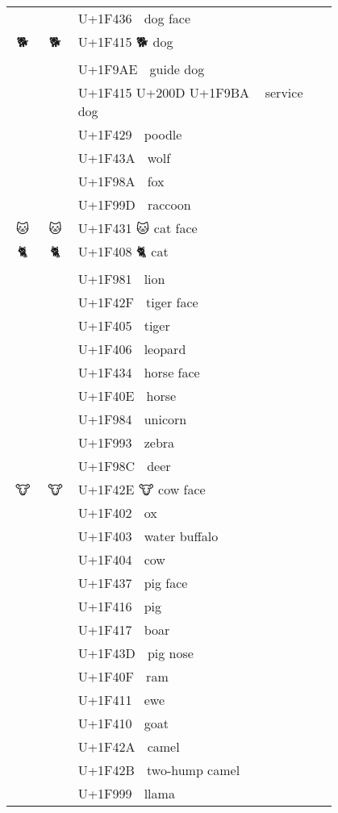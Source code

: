 \documentclass[a4paper,12pt]{article}
\newcommand{\fontA}[1]{{\fontspec[RawFeature={mode=harf,+dist,+ccmp}]{Segoe UI Emoji} #1}}
\newcommand{\fontB}[1]{{\fontspec[RawFeature={mode=harf,+dist,+ccmp}]{Noto Color Emoji} #1}}
\begin{document}
\begin{longtable}[c]{ccp{0.8\linewidth}}
\fontA{🐶}&\fontB{🐶}&U+1F436 🐶 dog face\\
\fontA{🐕}&\fontB{🐕}&U+1F415 🐕 dog\\
\fontA{🦮}&\fontB{🦮}&U+1F9AE 🦮 guide dog\\
\fontA{🐕‍🦺}&\fontB{🐕‍🦺}&U+1F415 U+200D U+1F9BA 🐕‍🦺 service dog\\
\fontA{🐩}&\fontB{🐩}&U+1F429 🐩 poodle\\
\fontA{🐺}&\fontB{🐺}&U+1F43A 🐺 wolf\\
\fontA{🦊}&\fontB{🦊}&U+1F98A 🦊 fox\\
\fontA{🦝}&\fontB{🦝}&U+1F99D 🦝 raccoon\\
\fontA{🐱}&\fontB{🐱}&U+1F431 🐱 cat face\\
\fontA{🐈}&\fontB{🐈}&U+1F408 🐈 cat\\
\fontA{🦁}&\fontB{🦁}&U+1F981 🦁 lion\\
\fontA{🐯}&\fontB{🐯}&U+1F42F 🐯 tiger face\\
\fontA{🐅}&\fontB{🐅}&U+1F405 🐅 tiger\\
\fontA{🐆}&\fontB{🐆}&U+1F406 🐆 leopard\\
\fontA{🐴}&\fontB{🐴}&U+1F434 🐴 horse face\\
\fontA{🐎}&\fontB{🐎}&U+1F40E 🐎 horse\\
\fontA{🦄}&\fontB{🦄}&U+1F984 🦄 unicorn\\
\fontA{🦓}&\fontB{🦓}&U+1F993 🦓 zebra\\
\fontA{🦌}&\fontB{🦌}&U+1F98C 🦌 deer\\
\fontA{🐮}&\fontB{🐮}&U+1F42E 🐮 cow face\\
\fontA{🐂}&\fontB{🐂}&U+1F402 🐂 ox\\
\fontA{🐃}&\fontB{🐃}&U+1F403 🐃 water buffalo\\
\fontA{🐄}&\fontB{🐄}&U+1F404 🐄 cow\\
\fontA{🐷}&\fontB{🐷}&U+1F437 🐷 pig face\\
\fontA{🐖}&\fontB{🐖}&U+1F416 🐖 pig\\
\fontA{🐗}&\fontB{🐗}&U+1F417 🐗 boar\\
\fontA{🐽}&\fontB{🐽}&U+1F43D 🐽 pig nose\\
\fontA{🐏}&\fontB{🐏}&U+1F40F 🐏 ram\\
\fontA{🐑}&\fontB{🐑}&U+1F411 🐑 ewe\\
\fontA{🐐}&\fontB{🐐}&U+1F410 🐐 goat\\
\fontA{🐪}&\fontB{🐪}&U+1F42A 🐪 camel\\
\fontA{🐫}&\fontB{🐫}&U+1F42B 🐫 two-hump camel\\
\fontA{🦙}&\fontB{🦙}&U+1F999 🦙 llama\\

\end{longtable}
\end{document}
